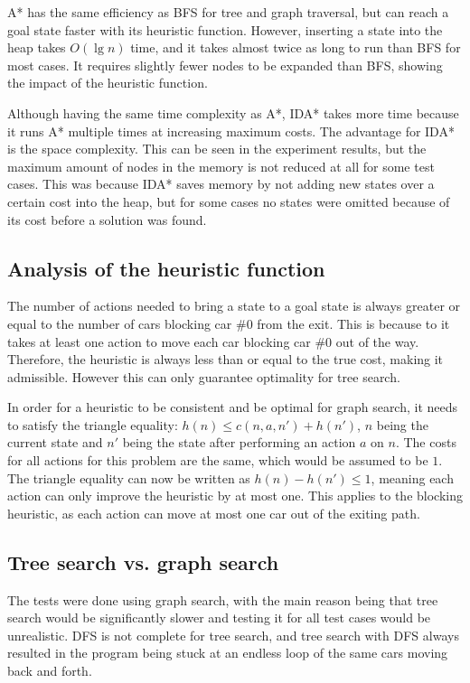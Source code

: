 \documentclass[12pt, a4paper]{article}
\begin{document}
A* has the same efficiency as BFS for tree and graph traversal, but can reach a goal state faster with its heuristic function. However, inserting a state into the heap takes $O(\lg n)$ time, and it takes almost twice as long to run than BFS for most cases. It requires slightly fewer nodes to be expanded than BFS, showing the impact of the heuristic function.

Although having the same time complexity as A*, IDA* takes more time because it runs A* multiple times at increasing maximum costs. The advantage for IDA* is the space complexity. This can be seen in the experiment results, but the maximum amount of nodes in the memory is not reduced at all for some test cases. This was because IDA* saves memory by not adding new states over a certain cost into the heap, but for some cases no states were omitted because of its cost before a solution was found.

\subsection{Analysis of the heuristic function}

The number of actions needed to bring a state to a goal state is always greater or equal to the number of cars blocking car \#0 from the exit. This is because to it takes at least one action to move each car blocking car \#0 out of the way. Therefore, the heuristic is always less than or equal to the true cost, making it admissible. However this can only guarantee optimality for tree search.

In order for a heuristic to be consistent and be optimal for graph search, it needs to satisfy the triangle equality: $h(n) \leq c(n,a,n') + h(n')$, $n$ being the current state and $n'$ being the state after performing an action $a$ on $n$. The costs for all actions for this problem are the same, which would be assumed to be $1$. The triangle equality can now be written as $h(n) - h(n') \leq 1$, meaning each action can only improve the heuristic by at most one. This applies to the blocking heuristic, as each action can move at most one car out of the exiting path.

\subsection{Tree search vs. graph search}

The tests were done using graph search, with the main reason being that tree search would be significantly slower and testing it for all test cases would be unrealistic. DFS is not complete for tree search, and tree search with DFS always resulted in the program being stuck at an endless loop of the same cars moving back and forth.
\end{document}
